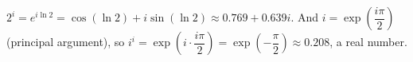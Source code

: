 $2^i=e^{i\ln2}=\cos(\ln2)+i\sin(\ln2)\approx0.769+0.639i$. And $i=\exp\left(\dfrac{i\pi}2\right)$ (principal argument), so $i^i=\exp\left(i\cdot\dfrac{i\pi}2\right)=\boxed{\exp\left(-\dfrac\pi2\right)}\approx0.208$, a real number.
